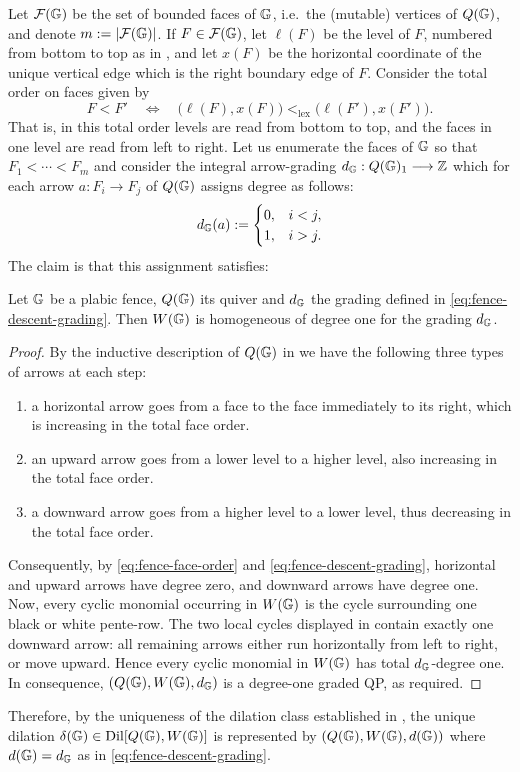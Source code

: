 Let $\mathcal F(\mathbb G)$ be the set of bounded faces of $\mathbb G$, i.e.~the (mutable) vertices of $Q(\mathbb G)$, and denote
$m:=|\mathcal F(\mathbb G)|$.  If $F\in\mathcal F(\mathbb G)$, let $\ell(F)$ be the level
of $F$, numbered from bottom to top as in \cite[Section~3.1]{CasalsGao}, and
let $x(F)$ be the horizontal coordinate of the unique vertical edge which is
the right boundary edge of $F$. Consider the total order on faces given by
\begin{equation}\label{eq:fence-face-order}
 F<F' \quad\Longleftrightarrow\quad
 \bigl(\ell(F),x(F)\bigr)<_{\mathrm{lex}}
 \bigl(\ell(F'),x(F')\bigr).
\end{equation}
That is, in this total order levels are read from bottom to top, and the faces in one level are read
from left to right. Let us enumerate the faces of $\mathbb G$ so that $F_1<\cdots<F_m$ and consider the integral arrow-grading $d_{\mathbb G}:Q(\mathbb G)_1\longrightarrow\mathbb Z$ which for each arrow $a:F_i\to F_j$ of $Q(\mathbb G)$ assigns degree as follows:
\begin{equation}\label{eq:fence-descent-grading}
 d_{\mathbb G}(a):=
 \begin{cases}
 0,&i<j,\\
 1,&i>j.
 \end{cases}
\end{equation}
The claim is that this assignment satisfies:

\begin{lemma}
Let $\mathbb G$ be a plabic fence, $Q(\mathbb G)$ its quiver and $d_\mathbb G$ the grading defined in \eqref{eq:fence-descent-grading}. Then $W(\mathbb G)$ is homogeneous of degree one for the grading $d_{\mathbb G}$.
\end{lemma}

\begin{proof}
By the inductive description of $Q(\mathbb G)$ in
 we have the following three types of arrows at each step:
\begin{enumerate}
    \item a horizontal arrow goes from a face to the
face immediately to its right, which is increasing in the total face order.

\item an upward arrow goes from a lower level to a
higher level, also increasing in the total face order.

\item a downward arrow goes from a higher level to a lower level, thus decreasing in the total face order.
\end{enumerate}

Consequently, by \eqref{eq:fence-face-order} and \eqref{eq:fence-descent-grading}, horizontal and
upward arrows have degree zero, and downward arrows have degree one. Now, every
cyclic monomial occurring in $W(\mathbb G)$ is the cycle surrounding one black or
white pente-row.  The two local cycles displayed in
 contain exactly one downward
arrow: all remaining arrows either run horizontally from left to right, or move upward.  Hence every cyclic monomial in $W(\mathbb G)$ has total
$d_{\mathbb G}$-degree one. In consequence, $(Q(\mathbb G),W(\mathbb G),d_{\mathbb G})$ is a degree-one graded
QP, as required.
\end{proof}

Therefore, by the uniqueness of the dilation class established in , the unique dilation $\delta(\mathbb G)\in\operatorname{Dil}[Q(\mathbb G),W(\mathbb G)]$ is represented by $(Q(\mathbb G),W(\mathbb G),d(\mathbb G))$ where $d(\mathbb G)=d_\mathbb G$ as in \eqref{eq:fence-descent-grading}.